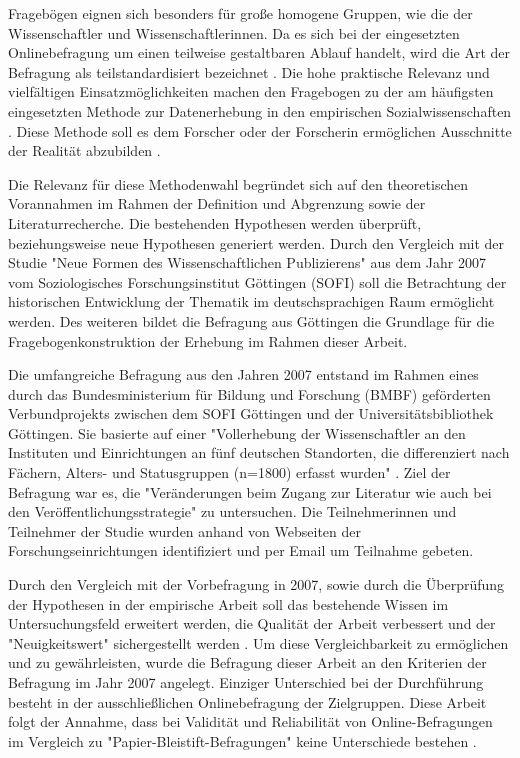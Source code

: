 Fragebögen eignen sich besonders für große homogene Gruppen, wie die der Wissenschaftler und Wissenschaftlerinnen. Da es sich bei der eingesetzten Onlinebefragung um einen teilweise gestaltbaren Ablauf handelt, wird die Art der Befragung als teilstandardisiert bezeichnet \cite{raab_2012_fragebogen}. Die hohe praktische Relevanz und vielfältigen Einsatzmöglichkeiten machen den Fragebogen zu der am häufigsten eingesetzten Methode zur Datenerhebung in den empirischen Sozialwissenschaften \cite{raab_2012_fragebogen}. Diese Methode soll es dem Forscher oder der Forscherin ermöglichen Ausschnitte der Realität abzubilden \cite{raab_2012_fragebogen}.

Die Relevanz für diese Methodenwahl begründet sich auf den theoretischen Vorannahmen im Rahmen der Definition und Abgrenzung sowie der Literaturrecherche. Die bestehenden Hypothesen werden überprüft, beziehungsweise neue Hypothesen generiert werden. Durch den Vergleich mit der Studie "Neue Formen des Wissenschaftlichen Publizierens" aus dem Jahr 2007 vom Soziologisches Forschungsinstitut Göttingen (SOFI) soll die Betrachtung der historischen Entwicklung der Thematik im deutschsprachigen Raum ermöglicht werden. Des weiteren bildet die Befragung aus Göttingen die Grundlage für die Fragebogenkonstruktion der Erhebung im Rahmen dieser Arbeit.

Die umfangreiche Befragung aus den Jahren 2007 entstand im Rahmen eines durch das Bundesministerium für Bildung und Forschung (BMBF) geförderten Verbundprojekts zwischen dem SOFI Göttingen und der Universitätsbibliothek Göttingen. Sie basierte auf einer "Vollerhebung der Wissenschaftler an den Instituten und Einrichtungen an fünf deutschen Standorten, die differenziert nach Fächern, Alters- und Statusgruppen (n=1800) erfasst wurden" \cite{Hanekop_2014}. Ziel der Befragung war es, die "Veränderungen beim Zugang zur Literatur wie auch bei den Veröffentlichungsstrategie" \cite{Hanekop_Wittke_2007_Fragebogen} zu untersuchen. Die Teilnehmerinnen und Teilnehmer der Studie wurden anhand von Webseiten der Forschungseinrichtungen identifiziert und per Email um Teilnahme gebeten.

Durch den Vergleich mit der Vorbefragung in 2007, sowie durch die Überprüfung der Hypothesen in der empirische Arbeit soll das bestehende Wissen im Untersuchungsfeld erweitert werden, die Qualität der Arbeit verbessert und der "Neuigkeitswert" sichergestellt werden \cite{raab_2012_fragebogen}. Um diese Vergleichbarkeit zu ermöglichen und zu gewährleisten, wurde die Befragung dieser Arbeit an den Kriterien der Befragung im Jahr 2007 angelegt. Einziger Unterschied bei der Durchführung besteht in der ausschließlichen Onlinebefragung der Zielgruppen. Diese Arbeit folgt der Annahme, dass bei Validität und Reliabilität von Online-Befragungen im Vergleich zu "Papier-Bleistift-Befragungen" keine Unterschiede bestehen \cite{Batinic_2013_onlinebefrag}.

